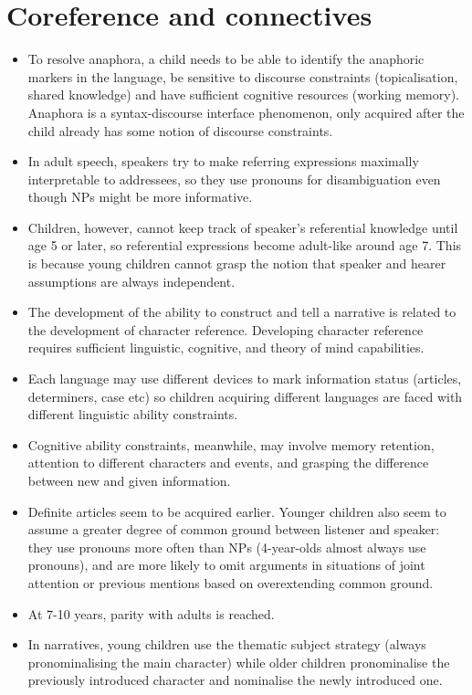 \documentclass{article}
\begin{document}
\section{Coreference and connectives}
\begin{itemize}
    \item To resolve anaphora, a child needs to be able to identify the anaphoric markers in the language, be sensitive to discourse constraints (topicalisation, shared knowledge) and have sufficient cognitive resources (working memory). Anaphora is a syntax-discourse interface phenomenon, only acquired after the child already has some notion of discourse constraints.
    \item In adult speech, speakers try to make referring expressions maximally interpretable to addressees, so they use pronouns for disambiguation even though NPs might be more informative.
    \item Children, however, cannot keep track of speaker's referential knowledge until age 5 or later, so referential expressions become adult-like around age 7. This is because young children cannot grasp the notion that speaker and hearer assumptions are always independent.
    \item The development of the ability to construct and tell a narrative is related to the development of character reference. Developing character reference requires sufficient linguistic, cognitive, and theory of mind capabilities.
    \item Each language may use different devices to mark information status (articles, determiners, case etc) so children acquiring different languages are faced with different linguistic ability constraints.
    \item Cognitive ability constraints, meanwhile, may involve memory retention, attention to different characters and events, and grasping the difference between new and given information.
    \item Definite articles seem to be acquired earlier. Younger children also seem to assume a greater degree of common ground between listener and speaker: they use pronouns more often than NPs (4-year-olds almost always use pronouns), and are more likely to omit arguments in situations of joint attention or previous mentions based on overextending common ground.
    \item At 7-10 years, parity with adults is reached.
    \item In narratives, young children use the thematic subject strategy (always pronominalising the main character) while older children pronominalise the previously introduced character and nominalise the newly introduced one.

\end{itemize}
\end{document}
